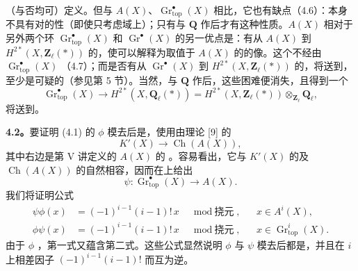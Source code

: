 （与否均可）定义。但与 $A(X)$、$\operatorname{Gr}_{\mathrm{top}}^\bullet(X)$ 相比，它也有缺点（4.6）：本身不具有对的性（即使只考虑域上）；只有与 $\mathbf Q$ 作后才有这种性质。$A(X)$ 相对于另外两个环 $\operatorname{Gr}_{\mathrm{top}}^\bullet(X)$ 和 $\operatorname{Gr}^\bullet(X)$ 的另一优点是：有从 $A(X)$ 到 $H^{2*}(X,\mathbf Z_\ell(*))$ 的，使可以解释为取值于 $A(X)$ 的的像。这个不经由 $\operatorname{Gr}_{\mathrm{top}}^\bullet(X)$ （4.7）；而是否有从 $\operatorname{Gr}^\bullet(X)$ 到 $H^{2*}(X,\mathbf Z_\ell(*))$ 的，将送到，至少是可疑的（参见第 5 节）。当然，与 $\mathbf Q$ 作后，这些困难便消失，且得到一个
\[\operatorname{Gr}_{\mathrm{top}}^\bullet(X)\longrightarrow
H^{2*}(X,\mathbf Q_\ell(*))
=H^{2*}(X,\mathbf Z_\ell(*))\otimes_{\mathbf Z_\ell}\mathbf Q_\ell,\tag{4.2}\]
将送到。

\textbf{4.2。}要证明 (4.1) 的 $\phi$ 模去后是，使用由理论 [9] 的 
\[K'(X)\longrightarrow\operatorname{Ch}(A(X)),\]
其中右边是第 V 讲定义的 $A(X)$ 的 。容易看出，它与 $K'(X)$ 的及 $\operatorname{Ch}(A(X))$ 的自然相容，因而在上给出
\[\psi:\operatorname{Gr}_{\mathrm{top}}^\bullet(X)\longrightarrow A(X).\tag{4.3}\]
我们将证明公式
\[\begin{aligned}
\psi\phi(x)&=(-1)^{i-1}(i-1)!\,x\quad\bmod\text{挠元},&&x\in A^i(X),\\
\phi\psi(x)&=(-1)^{i-1}(i-1)!\,x\quad\bmod\text{挠元},&&x\in\operatorname{Gr}_{\mathrm{top}}^i(X).
\end{aligned}\tag{4.4}\]
由于 $\phi$ ，第一式又蕴含第二式。这些公式显然说明 $\phi$ 与 $\psi$ 模去后都是，并且在 $i$ 上相差因子 $(-1)^{i-1}(i-1)!$ 而互为逆。

